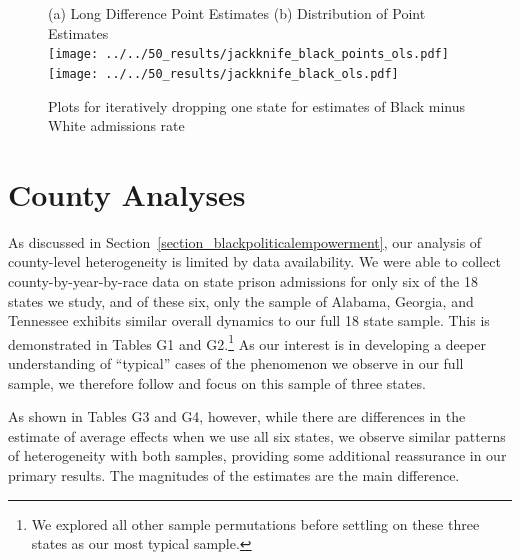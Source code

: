 \documentclass[12pt]{article}
\begin{document}
\begin{figure}[h!]
 	\begin{center}
 	\caption{ Plots for iteratively dropping one state for estimates of Black minus White admissions rate }
 	\small
		(a) Long Difference Point Estimates \hspace*{.4in} (b) Distribution of Point Estimates \\
 			\texttt{[image: ../../50\_results/jackknife\_black\_points\_ols.pdf]}
 			\texttt{[image: ../../50\_results/jackknife\_black\_ols.pdf]} \\
       \smallskip
       \label{figure_jackknife_bminusw}
       \end{center}
\end{figure} \normalsize







\section{County Analyses}\label{appendix_county}
\setcounter{table}{0}
\setcounter{figure}{0}
\renewcommand{\thetable}{G\arabic{table}}
\renewcommand{\thefigure}{G\arabic{figure}}
\normalsize

As discussed in Section~\ref{section_blackpoliticalempowerment}, our analysis of county-level heterogeneity is limited by data availability. We were able to collect county-by-year-by-race data on state prison admissions for only six of the 18 states we study, and of these six, only the sample of Alabama, Georgia, and Tennessee exhibits similar overall dynamics to our full 18 state sample. This is demonstrated in Tables G1 and G2.\footnote{We explored all other sample permutations before settling on these three states as our most typical sample.} As our interest is in developing a deeper understanding of ``typical'' cases of the phenomenon we observe in our full sample, we therefore follow  and focus on this sample of three states.

As shown in Tables G3 and G4, however, while there are differences in the estimate of average effects when we use all six states, we observe similar patterns of heterogeneity with both samples, providing some additional reassurance in our primary results.  The magnitudes of the estimates are the main difference.
\end{document}
